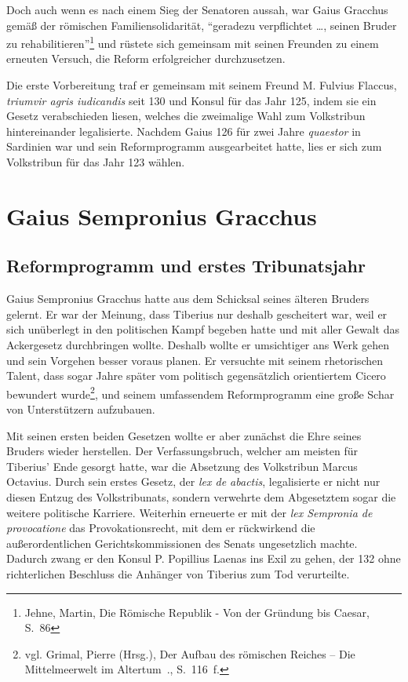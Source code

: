 \documentclass[
    12pt,
    smallheadings,
    ]{scrreprt}
\newcommand{\RM}[1]{\MakeUppercase{\romannumeral #1}}
\begin{document}
Doch auch wenn es nach einem Sieg der Senatoren aussah, war Gaius Gracchus gemäß der römischen Familiensolidarität, "`geradezu verpflichtet \lbrack\ldots\rbrack, seinen Bruder zu rehabilitieren"'\footnote{Jehne, Martin, Die Römische Republik - Von der Gründung bis Caesar, S.~86}
und rüstete sich gemeinsam mit seinen Freunden zu einem erneuten Versuch, die Reform erfolgreicher durchzusetzen.

\label{flaccus}Die erste Vorbereitung traf er gemeinsam mit seinem Freund M. Fulvius Flaccus, \textit{triumvir agris iudicandis} seit 130 und Konsul für das Jahr 125, indem sie ein Gesetz verabschieden liesen, welches die zweimalige Wahl zum Volkstribun hintereinander legalisierte.
Nachdem Gaius 126 für zwei Jahre \textit{quaestor} in Sardinien war und sein Reformprogramm ausgearbeitet hatte, lies er sich zum Volkstribun für das Jahr 123 wählen.


    \section{Gaius Sempronius Gracchus}
        \subsection{Reformprogramm und erstes Tribunatsjahr}
Gaius Sempronius Gracchus hatte aus dem Schicksal seines älteren Bruders gelernt.
Er war der Meinung, dass Tiberius nur deshalb gescheitert war, weil er sich unüberlegt in den politischen Kampf begeben hatte und mit aller Gewalt das Ackergesetz durchbringen wollte.
Deshalb wollte er umsichtiger ans Werk gehen und sein Vorgehen besser voraus planen.
Er versuchte mit seinem rhetorischen Talent, dass sogar Jahre später vom politisch gegensätzlich orientiertem Cicero bewundert wurde\footnote{vgl. Grimal, Pierre (Hrsg.), Der Aufbau des römischen Reiches -- Die Mittelmeerwelt im Altertum~\RM{3}., S.~116~f.},
und seinem umfassendem Reformprogramm eine große Schar von Unterstützern aufzubauen.

Mit seinen ersten beiden Gesetzen wollte er aber zunächst die Ehre seines Bruders wieder herstellen.
Der Verfassungsbruch, welcher am meisten für Tiberius' Ende gesorgt hatte, war die Absetzung des Volkstribun Marcus Octavius.
Durch sein erstes Gesetz, der \textit{lex de abactis}, legalisierte er nicht nur diesen Entzug des Volkstribunats, sondern verwehrte dem Abgesetztem sogar die weitere politische Karriere.
Weiterhin erneuerte er mit der \textit{lex Sempronia de provocatione} das Provokationsrecht, mit dem er rückwirkend die außerordentlichen Gerichtskommissionen des Senats ungesetzlich machte.
Dadurch zwang er den Konsul P. Popillius Laenas ins Exil zu gehen, der 132 ohne richterlichen Beschluss die Anhänger von Tiberius zum Tod verurteilte.
\end{document}
